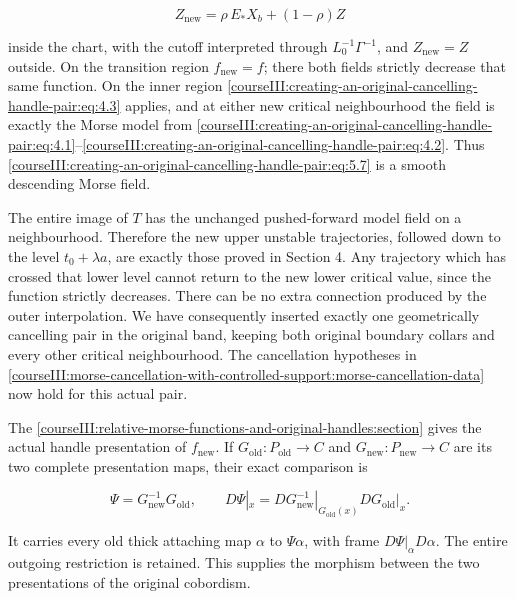\begin{equation}
Z_{\mathrm{new}}=\rho\,E_*X_b+(1-\rho)Z
 \label{courseIII:creating-an-original-cancelling-handle-pair:eq:5.7}
\end{equation}

inside the chart, with the cutoff interpreted through \(L_0^{-1}\Gamma^{-1}\), and \(Z_{\mathrm{new}}=Z\) outside. On the transition region \(f_{\mathrm{new}}=f\); there both fields strictly decrease that same function. On the inner region \eqref{courseIII:creating-an-original-cancelling-handle-pair:eq:4.3} applies, and at either new critical neighbourhood the field is exactly the Morse model from \eqref{courseIII:creating-an-original-cancelling-handle-pair:eq:4.1}--\eqref{courseIII:creating-an-original-cancelling-handle-pair:eq:4.2}. Thus \eqref{courseIII:creating-an-original-cancelling-handle-pair:eq:5.7} is a smooth descending Morse field.

The entire image of \(T\) has the unchanged pushed-forward model field on a neighbourhood. Therefore the new upper unstable trajectories, followed down to the level \(t_0+\lambda a\), are exactly those proved in Section 4. Any trajectory which has crossed that lower level cannot return to the new lower critical value, since the function strictly decreases. There can be no extra connection produced by the outer interpolation. We have consequently inserted exactly one geometrically cancelling pair in the original band, keeping both original boundary collars and every other critical neighbourhood. The cancellation hypotheses in \cref{courseIII:morse-cancellation-with-controlled-support:morse-cancellation-data} now hold for this actual pair.

The \cref{courseIII:relative-morse-functions-and-original-handles:section} gives the actual handle presentation of \(f_{\mathrm{new}}\). If \(G_{\mathrm{old}}:P_{\mathrm{old}}\to C\) and \(G_{\mathrm{new}}:P_{\mathrm{new}}\to C\) are its two complete presentation maps, their exact comparison is

\begin{equation}
\Psi=G_{\mathrm{new}}^{-1}G_{\mathrm{old}},\qquad
 D\Psi|_x=DG_{\mathrm{new}}^{-1}|_{G_{\mathrm{old}}(x)}
                                      DG_{\mathrm{old}}|_x.
 \label{courseIII:creating-an-original-cancelling-handle-pair:eq:5.8}
\end{equation}

It carries every old thick attaching map \(\alpha\) to \(\Psi\alpha\), with frame \(D\Psi|_\alpha D\alpha\). The entire outgoing restriction is retained. This supplies the morphism between the two presentations of the original cobordism.

